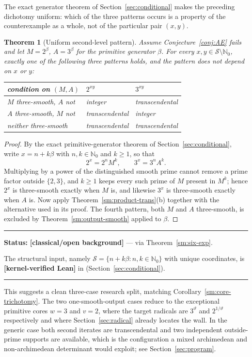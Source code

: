 \documentclass[11pt,oneside]{article}
\newtheorem{theorem}{Theorem}[section]
\theoremstyle{definition}
\theoremstyle{remark}
\newcommand{\Nzero}{\mathbb N_0}
\newcommand{\thetaq}{\vartheta}
\newcommand{\Sol}{\mathcal S}
\newcommand{\lean}[1]{\texttt{\detokenize{#1}}}
\newcommand{\statuslean}{\textcolor{leanblue}{\textbf{[kernel-verified Lean]}}}
\newcommand{\statusknown}{\textcolor{classicalgray}{\textbf{[classical/open background]}}}
\newenvironment{statusbox}[1]
{\begin{center}\begin{minipage}{0.94\textwidth}\raggedright\hbadness=10000\hrule
\vspace{0.45em}\textbf{Status:} #1\par\vspace{0.35em}}
{\vspace{0.35em}\hrule\end{minipage}\end{center}}
\begin{document}
The exact generator theorem of Section~\ref{sec:conditional} makes the preceding dichotomy
uniform: which of the three patterns occurs is a property of the counterexample as a whole,
not of the particular pair $(x,y)$.

\begin{theorem}[Uniform second-level pattern]
\label{sm:uniform-second-level}
Assume Conjecture~\ref{conj:AE} fails and let $M=2^{\beta}$, $A=3^{\beta}$ for the primitive
generator $\beta$.  For every $x,y\in\Sol\setminus\Nzero$, exactly one of the following three
patterns holds, and the pattern does not depend on $x$ or $y$:
\begin{center}
\begin{tabular}{@{}p{}p{}p{}@{}}
\toprule
condition on $(M,A)$ & $2^{xy}$ & $3^{xy}$\\
\midrule
$M$ three-smooth, $A$ not & integer & transcendental\\
$A$ three-smooth, $M$ not & transcendental & integer\\
neither three-smooth & transcendental & transcendental\\
\bottomrule
\end{tabular}
\end{center}
\end{theorem}

\begin{proof}
By the exact primitive-generator theorem of Section~\ref{sec:conditional}, write
$x=n+k\beta$ with $n,k\in\Nzero$ and $k\ge1$, so that
\[
 2^x=2^nM^k,\qquad 3^x=3^nA^k .
\]
Multiplying by a power of the distinguished smooth prime cannot remove a prime factor
outside $\{2,3\}$, and $k\ge1$ keeps every such prime of $M$ present in $M^k$; hence $2^x$ is
three-smooth exactly when $M$ is, and likewise $3^x$ is three-smooth exactly when $A$ is.
Now apply Theorem~\ref{sm:product-trans}(b) together with the alternative used in its proof.
The fourth pattern, both $M$ and $A$ three-smooth, is excluded by
Theorem~\ref{sm:output-smooth} applied to $\beta$.
\end{proof}

\begin{statusbox}{\statusknown{} --- via Theorem~\ref{sm:six-exp}.}
The structural input, namely $\Sol=\{n+k\beta:n,k\in\Nzero\}$ with unique coordinates, is
\statuslean{} in \lean{PrimitiveGenerator} (Section~\ref{sec:conditional}).
\end{statusbox}

This suggests a clean three-case research split, matching
Corollary~\ref{sm:core-trichotomy}.  The two one-smooth-output cases reduce to the
exceptional primitive cores $w=3$ and $v=2$, where the target radicals are $3^{\thetaq}$ and
$2^{1/\thetaq}$ respectively and where Section~\ref{sec:radical} already locates the wall.
In the generic case both second iterates are transcendental and two independent
outside-prime supports are available, which is the configuration a mixed archimedean and
non-archimedean determinant would exploit; see Section~\ref{sec:program}.
\end{document}
